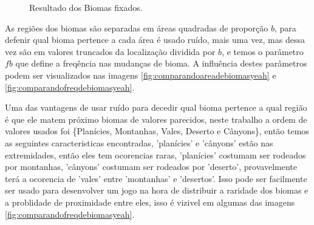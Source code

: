 \begin{figure}[H]
     \caption{Resultado dos Biomas fixados.}
     
     \label{fig:bssComBiomasFixados}
\end{figure}

As regiões dos biomas são separadas em áreas quadradas de proporção $b$, para defenir
qual bioma pertence a cada área é usado ruído, mais uma vez, mas dessa vez são em valores
truncados da localização dividida por $b$, e temos o parâmetro $fb$ que define a freqência nas
mudanças de bioma. A influência destes parâmetros podem ser visualizados nas imagens \ref{fig:comparandoareadebiomasyeah} e \ref{fig:comparandofreqdebiomasyeah}.

Uma das vantagens de usar ruído para decedir qual bioma pertence a qual 
região é que ele matem próximo biomas de valores parecidos, neste trabalho a ordem de 
valores usados foi \{Planícies, Montanhas, Vales, Deserto e Cânyons\}, então temos as seguintes
caracteristicas encontradas, 'planícies' e 'cânyons' estão nas extremidades, então eles 
tem ocorencias raras, 'planícies' costumam ser rodeados por montanhas, 'cânyons' costumam
ser rodeados por 'deserto', provavelmente terá a ocorencia de 'vales' entre 'montanhas' e 'desertos'.
Isso pode ser facilmente ser usado para desenvolver um jogo na hora de distribuir 
a raridade dos biomas e a problidade de proximidade entre eles, isso é vizivel em algumas das imagens \ref{fig:comparandofreqdebiomasyeah}.

